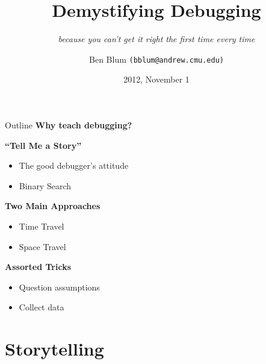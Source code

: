 \documentclass[xcolor=dvipsnames]{beamer}
\title[Demystifying Debugging]{{\bf Demystifying Debugging}}
\subtitle[]{{\em because you can't get it right the first time every time}}
\author[Ben Blum]{Ben Blum \texttt{(bblum@andrew.cmu.edu)}}
\institute[98-172]{Great Practical Ideas for Computer Scientists}
\date[]{2012, November 1}
\begin{document}
\normalem
\begin{frame}
	\titlepage
\end{frame}


\newcommand\linegap{\vspace{0.2in}}
\newcommand\breakslide[1]{\begin{frame}{} \begin{center} \Large #1 \end{center} \end{frame}}
\newcommand\related[1]{\textsuperscript{\em [#1]}}
\newcommand\hilight[2]{\color{#1}#2\color{black}}

\begin{frame}{Outline}
	\textbf{Why teach debugging?}
	\linegap

	\textbf{``Tell Me a Story''}
	\begin{itemize}
		\item The good debugger's attitude
		\item Binary Search
	\end{itemize}
	\linegap

	{\bf Two Main Approaches}
	\begin{itemize}
		\item Time Travel
		\item Space Travel
	\end{itemize}
	\linegap

	{\bf Assorted Tricks}
	\begin{itemize}
		\item Question assumptions
		\item Collect data
	\end{itemize}
\end{frame}

\section{Storytelling}



\end{document}
